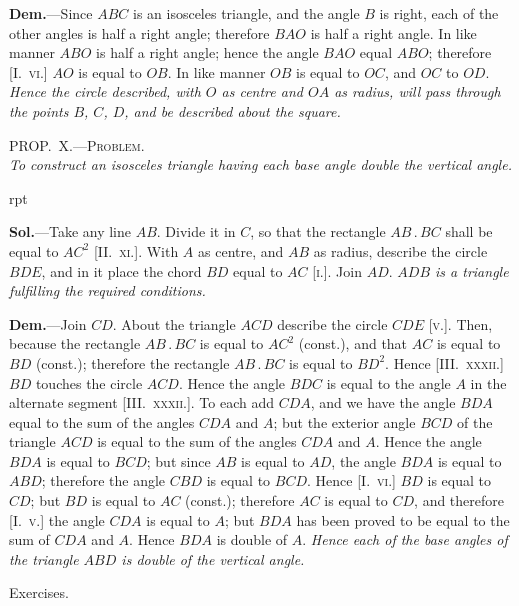 \documentclass[oneside]{book}
\newcommand\myprop[2]{
\bigskip\Needspace*{4\baselineskip}\begin{center}\textsc{#1}\\\medskip\emph{#2}\par\end{center}
}
\newcommand\exhead[1]{
\Needspace*{5\baselineskip}\begin{center}
\textsf{#1}
\end{center}
}
\newcommand\imgflow[3]{
\setcounter{wrapwidth}{#1}
\begin{wrapfigure}[#2]{r}{\value{wrapwidth}pt}
\begin{center}
\vspace{-0.3in}
\end{center}
\end{wrapfigure}
}
\begin{document}
\textbf{Dem.}---Since $ABC$ is an isosceles triangle, and the
angle $B$ is right, each of the other angles is half a right
angle; therefore $BAO$ is half a right angle. In like
manner $ABO$ is half a right angle; hence the angle
$BAO$ equal $ABO$; therefore [\textsc{I.~vi.}] $AO$ is equal to $OB$.
In like manner $OB$ is equal to $OC$, and $OC$ to $OD$.
\emph{Hence the circle described, with $O$ as centre and $OA$ as
radius, will pass through the points $B$, $C$, $D$, and be
described about the square.}

\myprop{PROP\@.~X.---Problem.}{To construct an isosceles triangle having each base angle
double the vertical angle.}

\imgflow{130}{11}{f162}

\textbf{Sol.}---Take any line $AB$. Divide it in $C$, so that the
rectangle $AB\,.\,BC$ shall be equal
to $AC^2$ [\textsc{II\@.~xi.}]. With $A$ as centre,
and $AB$ as radius, describe
the circle $BDE$, and in it place
the chord $BD$ equal to $AC$ [\textsc{i.}].
Join $AD$. \emph{$ADB$ is a triangle fulfilling
the required conditions.}

\textbf{Dem.}---Join $CD$. About the
triangle $ACD$ describe the circle
$CDE$ [\textsc{v.}]. Then, because the
rectangle $AB\,.\,BC$ is equal to
$AC^2$ (const.), and that $AC$ is equal to $BD$ (const.);
therefore the rectangle $AB\,.\,BC$ is equal to $BD^2$. Hence
[\textsc{III\@.~xxxii.}] $BD$ touches the circle $ACD$. Hence the
angle $BDC$ is equal to the angle $A$ in the alternate segment
[\textsc{III\@.~xxxii.}]. To each add $CDA$, and we have the
angle $BDA$ equal to the sum of the angles $CDA$ and $A$;
but the exterior angle $BCD$ of the triangle $ACD$ is
equal to the sum of the angles $CDA$ and $A$. Hence the
angle $BDA$ is equal to $BCD$; but since $AB$ is equal to
$AD$, the angle $BDA$ is equal to $ABD$; therefore the
angle $CBD$ is equal to $BCD$. Hence [\textsc{I.~vi.}] $BD$ is
equal to $CD$; but $BD$ is equal to $AC$ (const.); therefore
$AC$ is equal to $CD$, and therefore [\textsc{I.~v.}] the angle
$CDA$ is equal to $A$; but $BDA$ has been proved to be
equal to the sum of $CDA$ and $A$. Hence $BDA$ is double
of $A$. \textit{Hence each of the base angles of the triangle $ABD$
is double of the vertical angle.}

\exhead{Exercises.}
\end{document}
